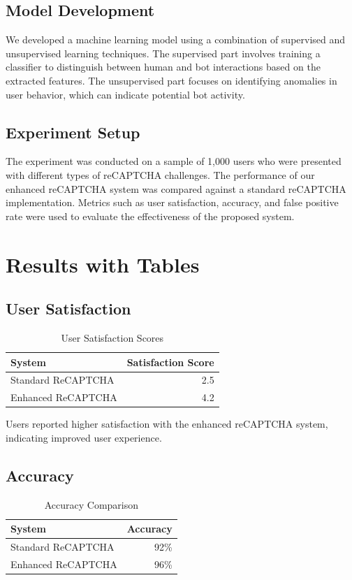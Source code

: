 \subsection{Model Development}
We developed a machine learning model using a combination of supervised and unsupervised learning techniques. The supervised part involves training a classifier to distinguish between human and bot interactions based on the extracted features. The unsupervised part focuses on identifying anomalies in user behavior, which can indicate potential bot activity.

\subsection{Experiment Setup}
The experiment was conducted on a sample of 1,000 users who were presented with different types of reCAPTCHA challenges. The performance of our enhanced reCAPTCHA system was compared against a standard reCAPTCHA implementation. Metrics such as user satisfaction, accuracy, and false positive rate were used to evaluate the effectiveness of the proposed system.

\section{Results with Tables}
\label{sec:results_tables}
\subsection{User Satisfaction}
\begin{table}[h]
\centering
\caption{User Satisfaction Scores}
\label{tab:user_satisfaction}
\begin{tabular}{|l|r|}
\hline
\textbf{System} & \textbf{Satisfaction Score} \\ \hline
Standard ReCAPTCHA & 2.5 \\
Enhanced ReCAPTCHA & 4.2 \\ \hline
\end{tabular}
\end{table}

Users reported higher satisfaction with the enhanced reCAPTCHA system, indicating improved user experience.

\subsection{Accuracy}
\begin{table}[h]
\centering
\caption{Accuracy Comparison}
\label{tab:accuracy}
\begin{tabular}{|l|r|}
\hline
\textbf{System} & \textbf{Accuracy} \\ \hline
Standard ReCAPTCHA & 92\% \\
Enhanced ReCAPTCHA & 96\% \\ \hline
\end{tabular}
\end{table}

